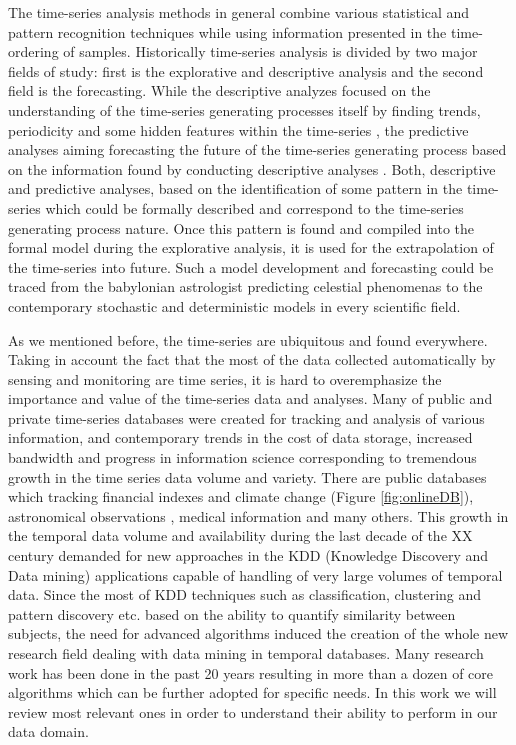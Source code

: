The time-series analysis methods in general combine various statistical and pattern recognition techniques while using information presented in the time-ordering of samples. Historically time-series analysis is divided by two major fields of study: first is the explorative and descriptive analysis and the second field is the forecasting. 
While the descriptive analyzes focused on the understanding of the time-series generating processes itself by finding trends, periodicity and some hidden features within the time-series \cite{citeulike:2206845}, the predictive analyses aiming forecasting the future of the time-series generating process based on the information found by conducting descriptive analyses \cite{citeulike:3449765}. 
Both, descriptive and predictive analyses, based on the identification of some pattern in the time-series which could be formally described and correspond to the time-series generating process nature. Once this pattern is found and compiled into the formal model during the explorative analysis, it is used for the extrapolation of the time-series into future. Such a model development and forecasting could be traced from the babylonian astrologist predicting celestial phenomenas to the contemporary stochastic and deterministic models in every scientific field.

As we mentioned before, the time-series are ubiquitous and found everywhere. Taking in account the fact that the most of the data collected automatically by sensing and monitoring are time series, it is hard to overemphasize the importance and value of the time-series data and analyses. Many of public and private time-series databases were created for tracking and analysis of various information, and contemporary trends in the cost of data storage, increased bandwidth and progress in information science corresponding to tremendous growth in the time series data volume and variety. There are public databases which tracking financial indexes and climate change (Figure \ref{fig:onlineDB}), astronomical observations \cite{citeulike:4373331}, medical information \cite{citeulike:4373332} and many others.  This growth in the temporal data volume and availability during the last decade of the XX century demanded for new approaches in the KDD (Knowledge Discovery and Data mining) applications capable of handling of very large volumes of temporal data. Since the most of KDD techniques such as classification, clustering and pattern discovery etc. based on the ability to quantify similarity between subjects, the need for advanced algorithms induced the creation of the whole new research field dealing with data mining in temporal databases. Many research work has been done in the past 20 years resulting in more than a dozen of core algorithms which can be further adopted for specific needs. In this work we will review most relevant ones in order to understand their ability to perform in our data domain.

